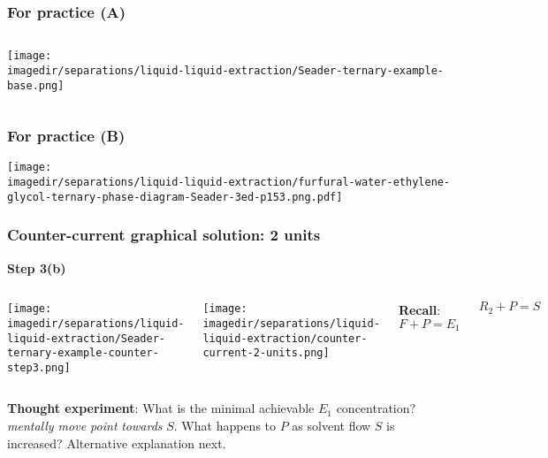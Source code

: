 \begin{frame}\frametitle{For practice (A)}
	\begin{columns}[t]
			\begin{center}
				\texttt{[image: \\imagedir/separations/liquid-liquid-extraction/Seader-ternary-example-base.png]}
			\end{center}
	\end{columns}	
\end{frame}

\begin{frame}\frametitle{For practice (B)}
	\begin{center}
		\texttt{[image: \\imagedir/separations/liquid-liquid-extraction/furfural-water-ethylene-glycol-ternary-phase-diagram-Seader-3ed-p153.png.pdf]}
	\end{center}
\end{frame}

\begin{frame}\frametitle{Counter-current graphical solution: 2 units}
	\textbf{Step 3(b)}
	\begin{columns}[t]
			\begin{center}
				\texttt{[image: \\imagedir/separations/liquid-liquid-extraction/Seader-ternary-example-counter-step3.png]}
			\end{center}
			\begin{center}
				\texttt{[image: \\imagedir/separations/liquid-liquid-extraction/counter-current-2-units.png]}
			\end{center}
			\textbf{Recall}: 
			\vspace{-10pt}
			\[	F + P = E_1 \]
			
			\[	R_2 + P = S \]
	\end{columns}
	\textbf{Thought experiment}: What is the minimal achievable $E_1$ concentration? \emph{mentally move point} {\color{myRed}{$M$}} \emph{towards} $S$. What happens to $P$ as solvent flow $S$ is increased? 
	{\small Alternative explanation next.}
\end{frame}

